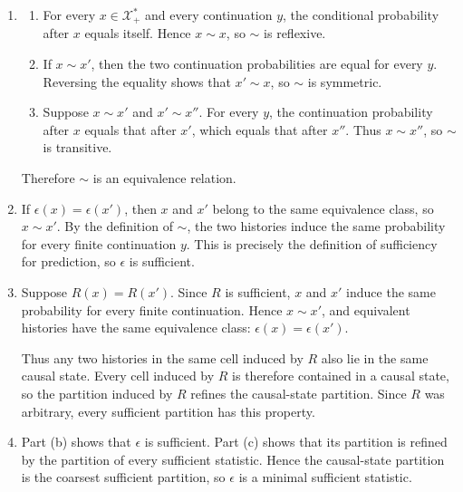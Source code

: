 \begin{solution}[ex:p2-2]
    \begin{enumerate}
      \item
        \begin{enumerate}
          \item For every $x\in\mathcal X_+^*$ and every continuation $y$,
            the conditional probability after $x$ equals itself. Hence
            $x\sim x$, so $\sim$ is reflexive.

          \item If $x\sim x'$, then the two continuation probabilities are
            equal for every $y$. Reversing the equality shows that
            $x'\sim x$, so $\sim$ is symmetric.

          \item Suppose $x\sim x'$ and $x'\sim x''$. For every $y$, the
            continuation probability after $x$ equals that after $x'$, which
            equals that after $x''$. Thus $x\sim x''$, so $\sim$ is
            transitive.
        \end{enumerate}
        Therefore $\sim$ is an equivalence relation.

      \item If $\epsilon(x)=\epsilon(x')$, then $x$ and $x'$ belong to the
        same equivalence class, so $x\sim x'$. By the definition of $\sim$,
        the two histories induce the same probability for every finite
        continuation $y$. This is precisely the definition of sufficiency for
        prediction, so $\epsilon$ is sufficient.

      \item Suppose $R(x)=R(x')$. Since $R$ is sufficient, $x$ and $x'$
        induce the same probability for every finite continuation. Hence
        $x\sim x'$, and equivalent histories have the same equivalence class:
        $\epsilon(x)=\epsilon(x')$.

        Thus any two histories in the same cell induced by $R$ also lie in the
        same causal state. Every cell induced by $R$ is therefore contained in
        a causal state, so the partition induced by $R$ refines the
        causal-state partition. Since $R$ was arbitrary, every sufficient
        partition has this property.

      \item Part (b) shows that $\epsilon$ is sufficient. Part (c) shows that
        its partition is refined by the partition of every sufficient
        statistic. Hence the causal-state partition is the coarsest sufficient
        partition, so $\epsilon$ is a minimal sufficient statistic.


\end{enumerate}
\end{solution}
